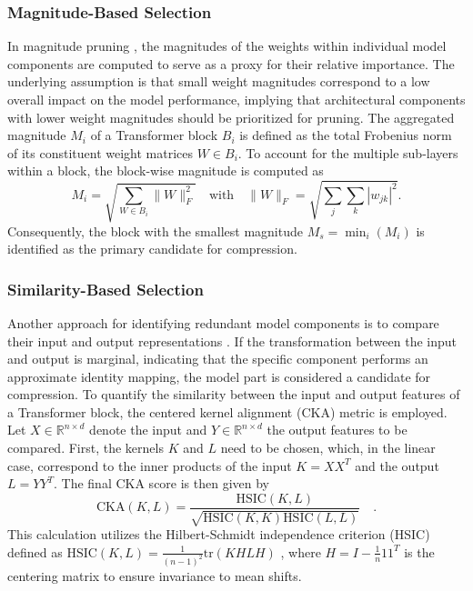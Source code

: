 \subsubsection{Magnitude-Based Selection}
\label{sec:MagnitudePruning}
In magnitude pruning \cite{han2015learning,filters2016pruning,lee2020layer}, the magnitudes of the weights within individual model components are computed to serve as a proxy for their relative importance. The underlying assumption is that small weight magnitudes correspond to a low overall impact on the model performance, implying that architectural components with lower weight magnitudes should be prioritized for pruning. The aggregated magnitude $M_i$ of a Transformer block $B_i$ is defined as the total Frobenius norm of its constituent weight matrices $W \in B_i$. To account for the multiple sub-layers within a block, the block-wise magnitude is computed as
\begin{equation} 
	M_i = \sqrt{\sum_{W \in B_i} \|W\|_F^2} \quad \text{with} \quad \|W\|_F = \sqrt{\sum_j \sum_k |w_{jk}|^2}.
\end{equation}
 Consequently, the block with the smallest magnitude $M_s = \min_i(M_i)$ is identified as the primary candidate for compression.

\subsubsection{Similarity-Based Selection}
\label{sec:CKA}
Another approach for identifying redundant model components is to compare their input and output representations \cite{men2024shortgpt}. If the transformation between the input and output is marginal, indicating that the specific component performs an approximate identity mapping, the model part is considered a candidate for compression. To quantify the similarity between the input and output features of a Transformer block, the centered kernel alignment (\gls{CKA}) metric \cite{kornblith2019similarity, pons2024effective} is employed. Let $X \in \mathbb{R}^{n\times d}$ denote the input and $Y \in \mathbb{R}^{n\times d}$ the output features to be compared. First, the kernels $K$ and $L$ need to be chosen, which, in the linear case, correspond to the inner products of the input  $K=XX^T$ and the output $L=YY^T$. The final \gls{CKA} score is then given by 
\begin{equation}
	\text{CKA}(K,L) = \frac{\text{HSIC}(K,L)}{\sqrt{\text{HSIC}(K,K) \text{HSIC}(L,L)}} \quad.
\end{equation}
This calculation utilizes the Hilbert-Schmidt independence criterion (\gls{HSIC}) \cite{gretton2005measuring} defined as $\text{HSIC}(K,L) = \frac{1}{(n-1)^2}\text{tr}(KHLH)$ \cite{davari2022reliability}, where $H=I - \frac{1}{n} 11^T$ is the centering matrix to ensure invariance to mean shifts.

